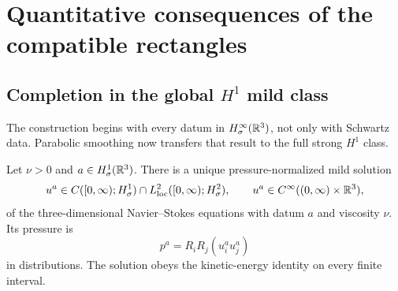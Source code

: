 \section{Quantitative consequences of the compatible rectangles}
\label{u:sec:quantitative-consequences}

\subsection[Completion in the global \texorpdfstring{\(H^1\)}{H1} mild class]
{Completion in the global \(H^1\) mild class}

The construction begins with every datum in
\(H^\infty_\sigma(\mathbb R^3)\), not only with Schwartz data.  Parabolic smoothing
now transfers that result to the full strong \(H^1\) class.

\begin{theorem}
\label{u:thm:qc-global-H1-completion}
Let \(\nu>0\) and \(a\in H^1_\sigma(\mathbb R^3)\).  There is a unique
pressure-normalized mild solution
\begin{equation}
 u^a\in C([0,\infty);H^1_\sigma)
 \cap L^2_{\rm loc}([0,\infty);H^2_\sigma),
 \qquad
 u^a\in C^\infty((0,\infty)\times\mathbb R^3),
 \label{u:eq:qc-global-H1-class}
\end{equation}
of the three-dimensional Navier--Stokes equations with datum \(a\) and
viscosity \(\nu\).  Its pressure is
\[
 p^a=R_iR_j(u_i^a u_j^a)
\]
in distributions.  The solution obeys the kinetic-energy identity on every
finite interval.
\end{theorem}

